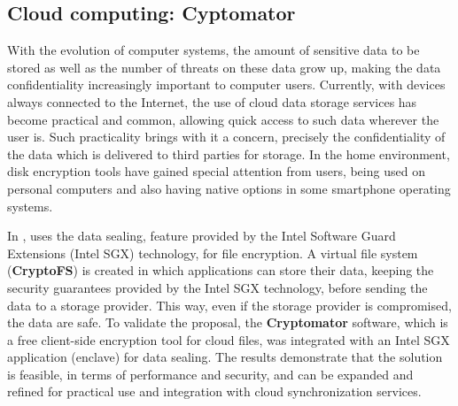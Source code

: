 \documentclass[lang=en]{sjtuarticle}
\begin{document}
\subsection{Cloud computing: Cyptomator}

With the evolution of computer systems, the amount
of sensitive data to be stored as well as the number of threats on
these data grow up, making the data confidentiality increasingly
important to computer users. Currently, with devices always
connected to the Internet, the use of cloud data storage services
has become practical and common, allowing quick access to
such data wherever the user is. Such practicality brings with
it a concern, precisely the confidentiality of the data which is
delivered to third parties for storage. In the home environment,
disk encryption tools have gained special attention from users,
being used on personal computers and also having native options
in some smartphone operating systems.

In \cite{closer20}, \citeauthor*{closer20} uses
the data sealing, feature provided by the Intel Software Guard
Extensions (Intel SGX) technology, for file encryption. A virtual
file system (\textbf{CryptoFS}) is created in which applications can store their data,
keeping the security guarantees provided by the Intel SGX
technology, before sending the data to a storage provider. This way,
even if the storage provider is compromised, the data are safe.
To validate the proposal, the \textbf{Cryptomator} software, which is a
free client-side encryption tool for cloud files, was integrated with
an Intel SGX application (enclave) for data sealing. The results
demonstrate that the solution is feasible, in terms of performance
and security, and can be expanded and refined for practical use
and integration with cloud synchronization services.
\end{document}
